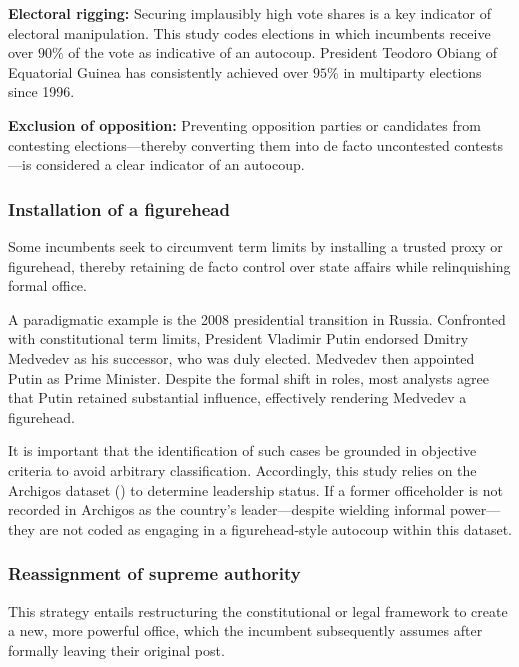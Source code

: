 \documentclass[
  12pt,
]{report}
\begin{document}
\textbf{Electoral rigging:} Securing implausibly high vote shares is a
key indicator of electoral manipulation. This study codes elections in
which incumbents receive over \(90\%\) of the vote as indicative of an
autocoup. President Teodoro Obiang of Equatorial Guinea has consistently
achieved over \(95\%\) in multiparty elections since 1996.

\textbf{Exclusion of opposition:} Preventing opposition parties or
candidates from contesting elections---thereby converting them into de
facto uncontested contests---is considered a clear indicator of an
autocoup.

\subsubsection*{Installation of a
figurehead}\label{installation-of-a-figurehead}

Some incumbents seek to circumvent term limits by installing a trusted
proxy or figurehead, thereby retaining de facto control over state
affairs while relinquishing formal office.

A paradigmatic example is the 2008 presidential transition in Russia.
Confronted with constitutional term limits, President Vladimir Putin
endorsed Dmitry Medvedev as his successor, who was duly elected.
Medvedev then appointed Putin as Prime Minister. Despite the formal
shift in roles, most analysts agree that Putin retained substantial
influence, effectively rendering Medvedev a figurehead.

It is important that the identification of such cases be grounded in
objective criteria to avoid arbitrary classification. Accordingly, this
study relies on the Archigos dataset
() to
determine leadership status. If a former officeholder is not recorded in
Archigos as the country's leader---despite wielding informal
power---they are not coded as engaging in a figurehead-style autocoup
within this dataset.

\subsubsection*{Reassignment of supreme
authority}\label{reassignment-of-supreme-authority}

This strategy entails restructuring the constitutional or legal
framework to create a new, more powerful office, which the incumbent
subsequently assumes after formally leaving their original post.
\end{document}
